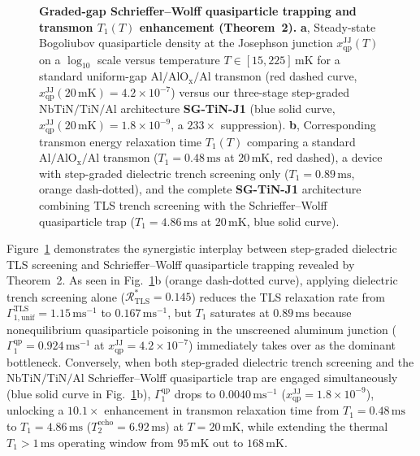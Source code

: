 \documentclass[11pt,letterpaper]{article}
\theoremstyle{definition}
\begin{document}
\begin{figure}[t!]
  \centering
  
  \caption{\textbf{Graded-gap Schrieffer--Wolff quasiparticle trapping and transmon $T_1(T)$ enhancement (Theorem~2).} \textbf{a}, Steady-state Bogoliubov quasiparticle density at the Josephson junction $x_{\mathrm{qp}}^{\mathrm{JJ}}(T)$ on a $\log_{10}$ scale versus temperature $T \in [15, 225]\,\mathrm{mK}$ for a standard uniform-gap $\mathrm{Al/AlO_x/Al}$ transmon (red dashed curve, $x_{\mathrm{qp}}^{\mathrm{JJ}}(20\,\mathrm{mK}) = 4.2\times 10^{-7}$) versus our three-stage step-graded $\mathrm{NbTiN/TiN/Al}$ architecture \textbf{SG-TiN-J1} (blue solid curve, $x_{\mathrm{qp}}^{\mathrm{JJ}}(20\,\mathrm{mK}) = 1.8\times 10^{-9}$, a $233\times$ suppression). \textbf{b}, Corresponding transmon energy relaxation time $T_1(T)$ comparing a standard $\mathrm{Al/AlO_x/Al}$ transmon ($T_1 = 0.48\,\mathrm{ms}$ at $20\,\mathrm{mK}$, red dashed), a device with step-graded dielectric trench screening only ($T_1 = 0.89\,\mathrm{ms}$, orange dash-dotted), and the complete \textbf{SG-TiN-J1} architecture combining TLS trench screening with the Schrieffer--Wolff quasiparticle trap ($T_1 = 4.86\,\mathrm{ms}$ at $20\,\mathrm{mK}$, blue solid curve).}
  \label{fig:quasiparticle_t1_scaling}
\end{figure}

Figure~\ref{fig:quasiparticle_t1_scaling} demonstrates the synergistic interplay between step-graded dielectric TLS screening and Schrieffer--Wolff quasiparticle trapping revealed by Theorem~2. As seen in Fig.~\ref{fig:quasiparticle_t1_scaling}b (orange dash-dotted curve), applying dielectric trench screening alone ($\mathcal{R}_{\mathrm{TLS}}^* = 0.145$) reduces the TLS relaxation rate from $\Gamma_{1,\mathrm{unif}}^{\mathrm{TLS}} = 1.15\,\mathrm{ms}^{-1}$ to $0.167\,\mathrm{ms}^{-1}$, but $T_1$ saturates at $0.89\,\mathrm{ms}$ because nonequilibrium quasiparticle poisoning in the unscreened aluminum junction ($\Gamma_1^{\mathrm{qp}} = 0.924\,\mathrm{ms}^{-1}$ at $x_{\mathrm{qp}}^{\mathrm{JJ}} = 4.2\times 10^{-7}$) immediately takes over as the dominant bottleneck. Conversely, when both step-graded dielectric trench screening and the $\mathrm{NbTiN/TiN/Al}$ Schrieffer--Wolff quasiparticle trap are engaged simultaneously (blue solid curve in Fig.~\ref{fig:quasiparticle_t1_scaling}b), $\Gamma_1^{\mathrm{qp}}$ drops to $0.0040\,\mathrm{ms}^{-1}$ ($x_{\mathrm{qp}}^{\mathrm{JJ}} = 1.8\times 10^{-9}$), unlocking a $10.1\times$ enhancement in transmon relaxation time from $T_1 = 0.48\,\mathrm{ms}$ to \textbf{$T_1 = 4.86\,\mathrm{ms}$} ($T_2^{\mathrm{echo}} = 6.92\,\mathrm{ms}$) at $T = 20\,\mathrm{mK}$, while extending the thermal $T_1 > 1\,\mathrm{ms}$ operating window from $95\,\mathrm{mK}$ out to $168\,\mathrm{mK}$.
\end{document}
